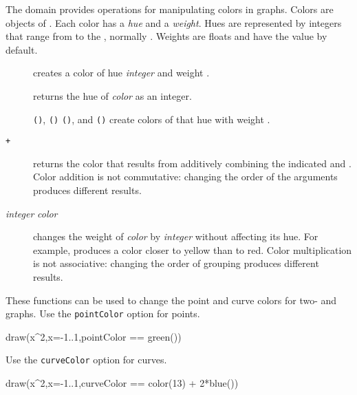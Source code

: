 The domain 
provides operations for manipulating
colors in \twodim{} graphs.
Colors are objects of .
Each color has a {\it hue} and a {\it weight}.
Hues are represented by integers that range from  to the
, normally
.
Weights are floats and  have the value  by default.
%
\begin{description}
%
\item[]
creates a color of hue {\it integer} and weight .
%
\item[]
returns the hue of {\it color} as an integer.
%
\item[]\texttt{()}, \texttt{()}
\texttt{()}, and \texttt{()}
\newline
create colors of that hue with weight .
%
\item[ {\tt +} ] returns the
color that results from additively combining the indicated
 and .
Color addition is not commutative: changing the order of the arguments
produces different results.
%
\item[{\it integer} {\tt *} {\it color}]
changes the weight of {\it color} by {\it integer}
without affecting its hue.
For example,
 produces a color closer to yellow than to red.
Color multiplication is not associative: changing the order of grouping
produces different results.
\end{description}
%
\begin{psXtc}
\begin{xtccomment}
These functions can be used to change the point and curve colors
for two- and \threedim{} graphs.
Use the {\tt pointColor} option for points.
\end{xtccomment}
\begin{spadsrc}
draw(x^2,x=-1..1,pointColor == green())
\end{spadsrc}
\end{psXtc}
%
\begin{psXtc}
\begin{xtccomment}
Use the {\tt curveColor} option for curves.
\end{xtccomment}
\begin{spadsrc}
draw(x^2,x=-1..1,curveColor == color(13) + 2*blue())
\end{spadsrc}
\end{psXtc}

